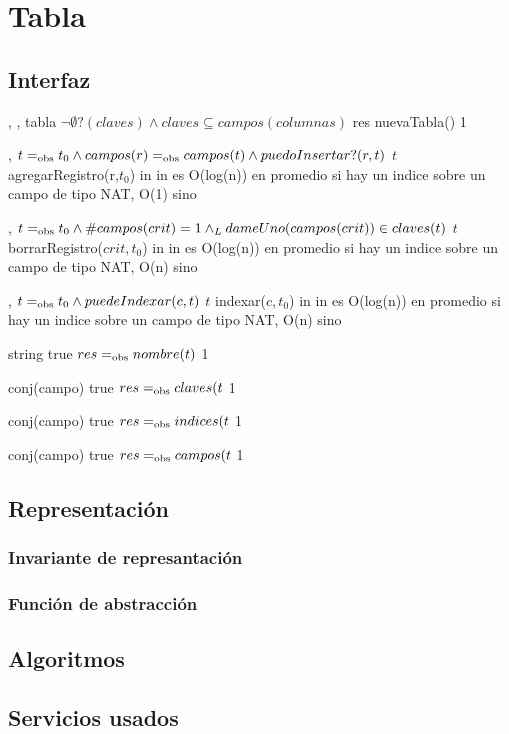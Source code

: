 \section{Tabla}

\subsection{Interfaz}

\iusa{}

\ioperaciones

{   ,
    ,
    } %
{tabla} %
{$\neg\emptyset?(claves) \land claves \subseteq campos(columnas)$} %
{res \igobs nuevaTabla()} %
{1} %
{} %
{} %

{   ,
    }
{}
{$t =_{\mathrm{obs}} t_0 \land campos(r) =_{\mathrm{obs}} campos(t) \land puedoInsertar?(r,t)$}
{$t$ \igobs agregarRegistro(r,$t_0$)}
{in}
{}
{in es O(log(n)) en promedio si hay un indice sobre un campo de tipo NAT, O(1) sino}

{   ,
    }
{}
{$t =_{\mathrm{obs}} t_0 \land \#campos(crit) = 1 \land_L dameUno(campos(crit)) \in claves(t)$}
{$t$ \igobs borrarRegistro($crit,t_0$)}
{in}
{}
{in es O(log(n)) en promedio si hay un indice sobre un campo de tipo NAT, O(n) sino}

{   ,
    }
{}
{$t =_{\mathrm{obs}} t_0 \land puedeIndexar(c,t)$}
{$t$ \igobs indexar($c,t_0$)}
{in}
{}
{in es O(log(n)) en promedio si hay un indice sobre un campo de tipo NAT, O(n) sino}

{   }
{string}
{true}
{$res =_{\mathrm{obs}} nombre(t)$}
{1}
{}
{}

{   }
{conj(campo)}
{true}
{$res =_{\mathrm{obs}} claves(t$}
{1}
{}
{}

{   }
{conj(campo)}
{true}
{$res =_{\mathrm{obs}} indices(t$}
{1}
{}
{}

{   }
{conj(campo)}
{true}
{$res =_{\mathrm{obs}} campos(t$}
{1}
{}
{}

\subsection{Representación}

\subsubsection{Invariante de represantación}

\subsubsection{Función de abstracción}

\subsection{Algoritmos}

\subsection{Servicios usados}

